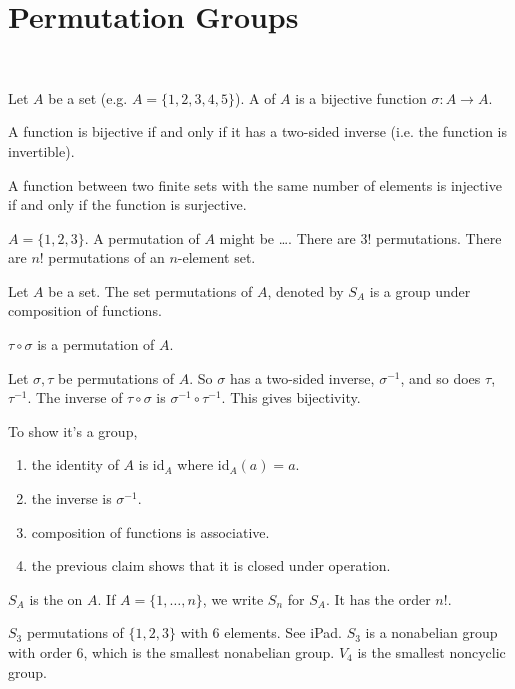 \documentclass[class=article,crop=false]{standalone}
\begin{document}
\section{Permutation Groups}
~\begin{defn}
	Let $ A $ be a set (e.g. $ A = \{1,2,3,4,5\} $). A  of $ A$ is a bijective function $ \sigma: A \to A$.
\end{defn}

\begin{thm}[]
	A function is bijective if and only if it has a two-sided inverse (i.e. the function is invertible).
\end{thm}

\begin{thm}[]
	A function between two finite sets with the same number of elements is injective if and only if the function is surjective.
\end{thm}

\begin{eg}[]
$ A=\{1,2,3\} $. A permutation of $ A$ might be \ldots. There are 3! permutations. There are $ n!$ permutations of an $ n$-element set.
\end{eg}

\begin{thm}
Let $ A$ be a set. The set permutations of  $ A$, denoted by  $ S_A$ is a group under composition of functions.
\end{thm}
\begin{claim}[]
$ \tau \circ \sigma$ is a permutation of $ A$.
\end{claim}
\begin{prf}
Let $ \sigma, \tau$ be permutations of $ A$. So  $ \sigma$ has a two-sided inverse, $ \sigma^{-1}$, and so does $ \tau$, $ \tau^{-1}$. The inverse of $ \tau \circ \sigma$ is $ \sigma^{-1} \circ \tau^{-1}$. This gives bijectivity.
\end{prf}

\begin{prf}
To show it's a group, 
\begin{enumerate}[label=\arabic*)]
	\item the identity of $ A$ is  id$_A$ where  id$_A(a)=a $. 
	\item the inverse is $ \sigma^{-1}$.
	\item composition of functions is associative.
	\item the previous claim shows that it is closed under operation.
\end{enumerate}
\end{prf}

\begin{defn}
$ S_A$ is the   on $ A$. If  $ A=\{1,\ldots,n\} $, we write $ S_n$ for  $ S_A$. It has the order  $ n!$.
\end{defn}

\begin{eg}[]
$ S_3$ permutations of  $ \{1,2,3\} $ with 6 elements. See iPad. $ S_3$ is a nonabelian group with order 6, which is the smallest nonabelian group.  $ V_4$ is the smallest noncyclic group.
\end{eg}
\end{document}
